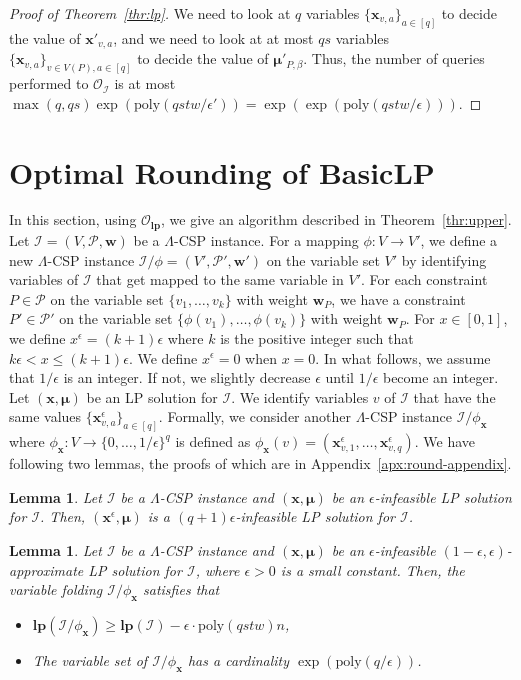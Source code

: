 \documentclass[letterpaper, 11pt]{article}
\newtheorem{lemma}[theorem]{Lemma}
\newcommand{\calI}{\mathcal{I}}
\newcommand{\calO}{\mathcal{O}}
\newcommand{\calP}{\mathcal{P}}
\newcommand{\biw}{\boldsymbol{w}}
\newcommand{\bix}{\boldsymbol{x}}
\newcommand{\bimu}{\boldsymbol{\mu}}
\newcommand{\blp}{\textsf{BasicLP}\xspace}
\newcommand{\lp}{\mathbf{lp}}
\newcommand{\poly}{\mathrm{poly}}
\begin{document}
\begin{proof}[Proof of Theorem~\ref{thr:lp}]
  We need to look at $q$ variables $\{\bix_{v,a}\}_{a\in [q]}$ to decide the value of $\bix'_{v,a}$,
  and we need to look at at most $qs$ variables $\{\bix_{v,a}\}_{v\in V(P), a\in [q]}$ to decide the value of $\bimu'_{P,\beta}$.
  Thus, the number of queries performed to $\calO_{\calI}$ is at most 
  \(
  \max(q,qs)\exp(\poly(qstw/\epsilon'))=\exp(\exp(\poly(qstw/\epsilon)))
  \).
\end{proof}

\section{Optimal Rounding of \blp}\label{sec:round}
In this section, using $\calO_{\lp}$, we give an algorithm described in Theorem~\ref{thr:upper}.
Let $\calI=(V,\calP,\biw)$ be a $\Lambda$-CSP instance.
For a mapping $\phi:V\to V'$, 
we define a new $\Lambda$-CSP instance $\calI/\phi=(V',\calP',\biw')$ on the variable set $V'$ by identifying variables of $\calI$ that get mapped to the same variable in $V'$.
For each constraint $P\in \calP$ on the variable set $\{v_1,\ldots,v_k\}$ with weight $\biw_P$,
we have a constraint $P'\in \calP'$ on the variable set $\{\phi(v_1),\ldots,\phi(v_k)\}$ with weight $\biw_P$.
For $x\in [0,1]$, 
we define $x^\epsilon=(k+1)\epsilon$ where $k$ is the positive integer such that $k\epsilon < x \leq (k+1)\epsilon$.
We define $x^\epsilon=0$ when $x=0$.
In what follows, we assume that $1/\epsilon$ is an integer.
If not, we slightly decrease $\epsilon$ until $1/\epsilon$ become an integer.
Let $(\bix,\bimu)$ be an LP solution for $\calI$.
We identify variables $v$ of $\calI$ that have the same values $\{\bix_{v,a}^\epsilon\}_{a\in [q]}$.
Formally, we consider another $\Lambda$-CSP instance $\calI/\phi_{\bix}$ 
where $\phi_{\bix}:V\to \{0,\ldots,1/\epsilon\}^q$ is defined as \( \phi_{\bix}(v)=(\bix_{v,1}^\epsilon,\ldots,\bix_{v,q}^\epsilon) \).
We have following two lemmas, the proofs of which are in Appendix~\ref{apx:round-appendix}.
\begin{lemma}\label{lmm:discretize}
  Let $\calI$ be a $\Lambda$-CSP instance and $(\bix,\bimu)$ be an $\epsilon$-infeasible LP solution for $\calI$.
  Then, $(\bix^\epsilon,\bimu)$ is a $(q+1)\epsilon$-infeasible LP solution for $\calI$.
\end{lemma}
\begin{lemma}\label{lmm:compression}
  Let $\calI$ be a $\Lambda$-CSP instance and $(\bix,\bimu)$ be an $\epsilon$-infeasible $(1-\epsilon,\epsilon)$-approximate LP solution for $\calI$,
  where $\epsilon>0$ is a small constant.
  Then, the variable folding $\calI/\phi_{\bix}$ satisfies that
  \begin{itemize}
    \setlength{\itemsep}{0pt}
  \item $\lp(\calI/\phi_{\bix})\geq \lp(\calI)- \epsilon\cdot \poly(qstw) n$,
  \item The variable set of $\calI/\phi_{\bix}$ has a cardinality $\exp(\poly(q/\epsilon))$.
  \end{itemize}
\end{lemma}
\end{document}
